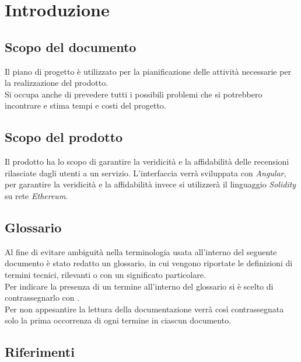 \section{Introduzione}

\subsection{Scopo del documento}
Il piano di progetto è utilizzato per la pianificazione delle attività necessarie per la realizzazione del prodotto. \\
Si occupa anche di prevedere tutti i possibili problemi che si potrebbero incontrare e stima tempi e costi del progetto.

\subsection{Scopo del prodotto}
Il prodotto ha lo scopo di garantire la veridicità e la affidabilità 
delle recensioni rilasciate dagli utenti a un servizio. L'interfaccia verrà
sviluppata con \textit{Angular}, per garantire la veridicità e la affidabilità 
invece si utilizzerà il linguaggio \textit{Solidity} su rete \textit{Ethereum}.

\subsection{Glossario}
Al fine di evitare ambiguità nella terminologia usata all'interno del seguente
documento è stato redatto un glossario, in cui vengono riportate le definizioni
di termini tecnici, rilevanti o con un significato particolare. \\ Per indicare
la presenza di un termine all'interno del glossario si è scelto di
contrassegnarlo con \glo.\\ Per non appesantire la lettura della documentazione
verrà così contrassegnata solo la prima occorrenza di ogni termine in ciascun
documento.

\subsection{Riferimenti}
